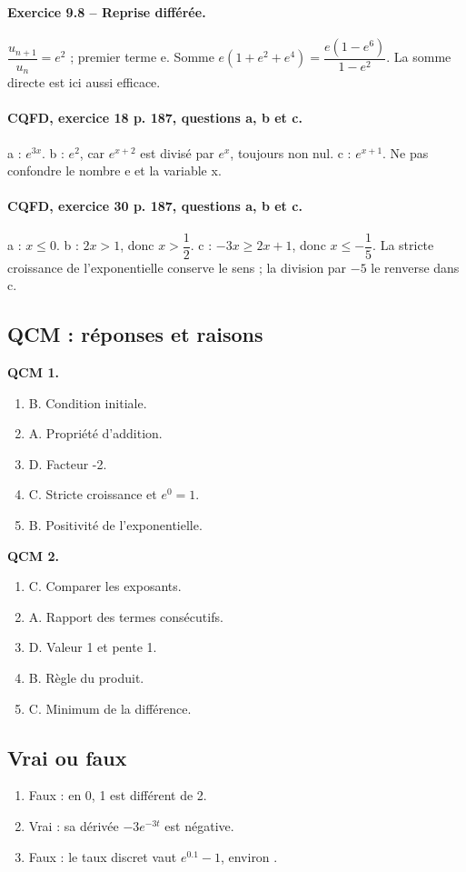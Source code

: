 \paragraph{Exercice 9.8 -- Reprise différée.} $\dfrac{u_{n+1}}{u_n}=e^2$ ; premier terme e. Somme $e(1+e^2+e^4)=\dfrac{e(1-e^6)}{1-e^2}$. La somme directe est ici aussi efficace.
\paragraph{CQFD, exercice 18 p. 187, questions a, b et c.} a : $e^{3x}$. b : $e^2$, car $e^{x+2}$ est divisé par $e^x$, toujours non nul. c : $e^{x+1}$. Ne pas confondre le nombre e et la variable x.
\paragraph{CQFD, exercice 30 p. 187, questions a, b et c.} a : $x\leq0$. b : $2x>1$, donc $x>\dfrac12$. c : $-3x\geq2x+1$, donc $x\leq-\dfrac15$. La stricte croissance de l’exponentielle conserve le sens ; la division par $-5$ le renverse dans c.
\subsection*{QCM : réponses et raisons}
\textbf{QCM 1.}
\begin{enumerate}
\item B. Condition initiale.
\item A. Propriété d’addition.
\item D. Facteur -2.
\item C. Stricte croissance et $e^0=1$.
\item B. Positivité de l’exponentielle.
\end{enumerate}
\textbf{QCM 2.}
\begin{enumerate}
\item C. Comparer les exposants.
\item A. Rapport des termes consécutifs.
\item D. Valeur 1 et pente 1.
\item B. Règle du produit.
\item C. Minimum de la différence.
\end{enumerate}
\subsection*{Vrai ou faux}
\begin{enumerate}
\item Faux : en 0, 1 est différent de 2.
\item Vrai : sa dérivée $-3e^{-3t}$ est négative.
\item Faux : le taux discret vaut $e^{\num{0,1}}-1$, environ .
\end{enumerate}
